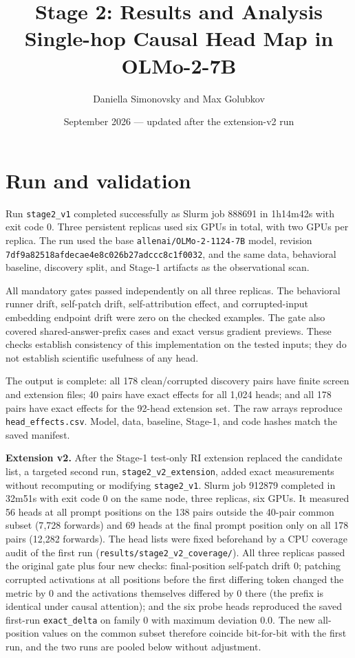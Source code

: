 \documentclass[11pt,a4paper]{article}
\title{Stage 2: Results and Analysis\\\large Single-hop Causal Head Map in OLMo-2-7B}
\author{Daniella Simonovsky and Max Golubkov}
\date{September 2026 --- updated after the extension-v2 run}
\begin{document}
\maketitle

\section{Run and validation}
Run \texttt{stage2\_v1} completed successfully as Slurm job 888691 in 1h14m42s
with exit code 0. Three persistent replicas used six GPUs in total, with two
GPUs per replica. The run used the base \texttt{allenai/OLMo-2-1124-7B} model,
revision \texttt{7df9a82518afdecae4e8c026b27adccc8c1f0032}, and the same
data, behavioral baseline, discovery split, and Stage-1 artifacts as the
observational scan.

All mandatory gates passed independently on all three replicas. The behavioral
runner drift, self-patch drift, self-attribution effect, and corrupted-input
embedding endpoint drift were zero on the checked examples. The gate also
covered shared-answer-prefix cases and exact versus gradient previews. These
checks establish consistency of this implementation on the tested inputs; they
do not establish scientific usefulness of any head.

The output is complete: all 178 clean/corrupted discovery pairs have finite
screen and extension files; 40 pairs have exact effects for all 1,024 heads;
and all 178 pairs have exact effects for the 92-head extension set. The raw
arrays reproduce \texttt{head\_effects.csv}. Model, data, baseline, Stage-1,
and code hashes match the saved manifest.

\textbf{Extension v2.} After the Stage-1 test-only RI extension replaced the
candidate list, a targeted second run, \texttt{stage2\_v2\_extension}, added
exact measurements without recomputing or modifying \texttt{stage2\_v1}.
Slurm job 912879 completed in 32m51s with exit code 0 on the same node, three
replicas, six GPUs. It measured 56 heads at all prompt positions on the 138
pairs outside the 40-pair common subset (7{,}728 forwards) and 69 heads at the
final prompt position only on all 178 pairs (12{,}282 forwards). The head lists
were fixed beforehand by a CPU coverage audit of the first run
(\texttt{results/stage2\_v2\_coverage/}). All three replicas passed the
original gate plus four new checks: final-position self-patch drift 0; patching
corrupted activations at all positions before the first differing token changed
the metric by 0 and the activations themselves differed by 0 there (the prefix is
identical under causal attention); and the six probe heads reproduced the saved
first-run \texttt{exact\_delta} on family 0 with maximum deviation 0.0. The
new all-position values on the common subset therefore coincide bit-for-bit
with the first run, and the two runs are pooled below without adjustment.
\end{document}

